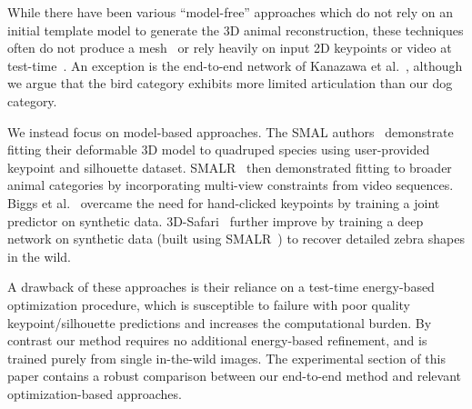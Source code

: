


While there have been various ``model-free'' approaches which do not rely on an initial template model to generate the 3D animal reconstruction, these techniques often do not produce a mesh~\cite{Agudo_2018_CVPR,novotny19c3dpo} or rely heavily on input 2D keypoints or video at test-time~\cite{vicente_3dv,Probst2018_ECCVa}. An exception is the end-to-end network of Kanazawa et al.~\cite{kanazawa2018birds}, although we argue that the bird category exhibits more limited articulation than our dog category.

We instead focus on model-based approaches. The SMAL authors~\cite{zuffi2017menagerie} demonstrate fitting their deformable 3D model to quadruped species using user-provided keypoint and silhouette dataset. SMALR~\cite{zuffi_lions} then demonstrated fitting to broader animal categories by incorporating multi-view constraints from video sequences. Biggs et al.~\cite{biggs2018creatures} overcame the need for hand-clicked keypoints by training a joint predictor on synthetic data. 3D-Safari~\cite{Zuffi19Safari} further improve by training a deep network on synthetic data (built using SMALR~\cite{zuffi_lions}) to recover detailed zebra shapes in the wild.

A drawback of these approaches is their reliance on a test-time energy-based optimization procedure, which is susceptible to failure with poor quality keypoint/silhouette predictions and increases the computational burden. By contrast our method requires no additional energy-based refinement, and is trained purely from single in-the-wild images. The experimental section of this paper contains a robust comparison between our end-to-end method and relevant optimization-based approaches. 

